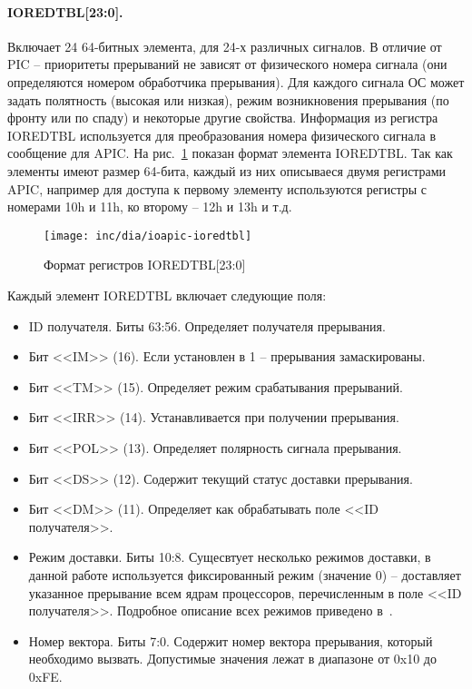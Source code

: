 \paragraph{IOREDTBL[23:0].} Включает 24 64-битных элемента, для 24-х различных сигналов. В отличие от PIC -- приоритеты
прерываний не зависят от физического номера сигнала (они определяются номером обработчика прерывания). Для каждого
сигнала ОС может задать полятность (высокая или низкая), режим возникновения прерывания (по фронту или по спаду) и некоторые
другие свойства. Информация из регистра IOREDTBL используется для преобразования номера физического сигнала в сообщение для
APIC. На рис.~\ref{fig:ioapic-ioredtbl} показан формат элемента IOREDTBL. Так как элементы имеют размер 64-бита, каждый
из них описываеся двумя регистрами APIC, например для доступа к первому элементу используются регистры с номерами 10h и 11h,
ко второму -- 12h и 13h и т.д.

\begin{figure}[ht!]
  \centering
  \texttt{[image: inc/dia/ioapic-ioredtbl]}
  \caption{Формат регистров IOREDTBL[23:0]}
  \label{fig:ioapic-ioredtbl}
\end{figure}

Каждый элемент IOREDTBL включает следующие поля:
\begin{itemize}
\item ID получателя. Биты 63:56. Определяет получателя прерывания.
\item Бит <<IM>> (16). Если установлен в 1 -- прерывания замаскированы.
\item Бит <<TM>> (15). Определяет режим срабатывания прерываний.
\item Бит <<IRR>> (14). Устанавливается при получении прерывания.
\item Бит <<POL>> (13). Определяет полярность сигнала прерывания.
\item Бит <<DS>> (12). Содержит текущий статус доставки прерывания.
\item Бит <<DM>> (11). Определяет как обрабатывать поле <<ID получателя>>.
\item Режим доставки. Биты 10:8. Сущесвтует несколько режимов доставки, в данной работе используется
	фиксированный режим (значение 0) -- доставляет указанное прерывание всем ядрам процессоров,
	перечисленным в поле <<ID получателя>>. Подробное описание всех режимов приведено в~\cite{ioapic}.
\item Номер вектора. Биты 7:0. Содержит номер вектора прерывания, который необходимо вызвать.
	Допустимые значения лежат в диапазоне от 0x10 до 0xFE.
\end{itemize}


